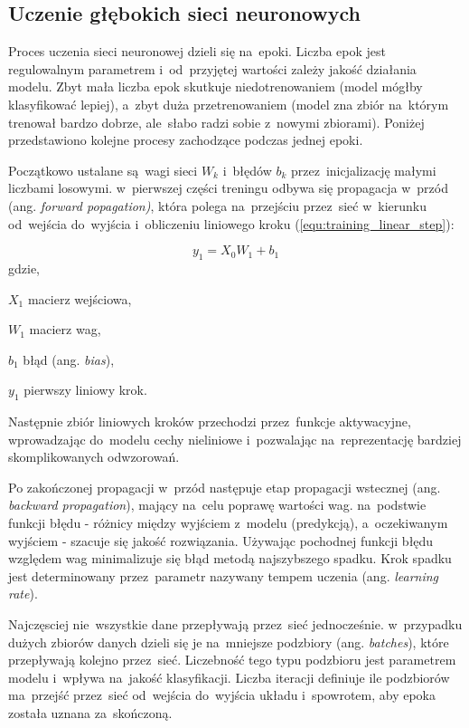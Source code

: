 \subsection{Uczenie głębokich sieci neuronowych}
Proces uczenia sieci neuronowej dzieli się na~epoki. Liczba epok jest regulowalnym parametrem i~od~przyjętej wartości zależy jakość działania modelu. Zbyt mała liczba epok skutkuje niedotrenowaniem (model mógłby klasyfikować lepiej), a~zbyt duża przetrenowaniem (model zna zbiór na~którym trenował bardzo dobrze, ale~słabo radzi sobie z~nowymi zbiorami). Poniżej przedstawiono kolejne procesy zachodzące podczas jednej epoki.

{\parindent0pt %
Początkowo ustalane są~wagi sieci $W_k$ i~błędów $b_k$ przez~inicjalizację małymi liczbami losowymi. w~pierwszej części treningu odbywa się propagacja w~przód (ang. \textit{forward popagation)}, która polega na~przejściu przez~sieć w~kierunku od~wejścia do~wyjścia i~obliczeniu liniowego kroku (\ref{equ:training_linear_step}):

\begin{equation}
y_1 = X_0 W_1 + b_1
\label{equ:training_linear_step}
\end{equation}
gdzie,
\begin{eqwhere}[2cm]
	\item[$X_1$] macierz wejściowa,
	\item[$W_1$] macierz wag,
	\item[$b_1$] błąd (ang. \textit{bias}),
	\item[$y_1$] pierwszy liniowy krok.
\end{eqwhere}

Następnie zbiór liniowych kroków przechodzi przez~funkcje aktywacyjne, wprowadzając do~modelu cechy nieliniowe i~pozwalając na~reprezentację bardziej skomplikowanych odwzorowań.

Po zakończonej propagacji w~przód następuje etap propagacji wstecznej (ang. \textit{backward propagation}), mający na~celu poprawę wartości wag. na~podstwie funkcji błędu - różnicy między wyjściem z~modelu (predykcją), a~oczekiwanym wyjściem - szacuje się jakość rozwiązania. Używając pochodnej funkcji błędu względem wag minimalizuje się błąd metodą najszybszego spadku. Krok spadku jest determinowany przez~parametr nazywany tempem uczenia (ang. \textit{learning rate}). 

Najczęsciej nie~wszystkie dane przepływają przez~sieć jednocześnie. w~przypadku dużych zbiorów danych dzieli się je na~mniejsze podzbiory (ang. \textit{batches}), które przepływają kolejno przez~sieć. Liczebność tego typu podzbioru jest parametrem modelu i~wpływa na~jakość klasyfikacji. Liczba iteracji definiuje ile podzbiorów ma~przejść przez~sieć od~wejścia do~wyjścia układu i~spowrotem, aby epoka została uznana za~skończoną. 
}

